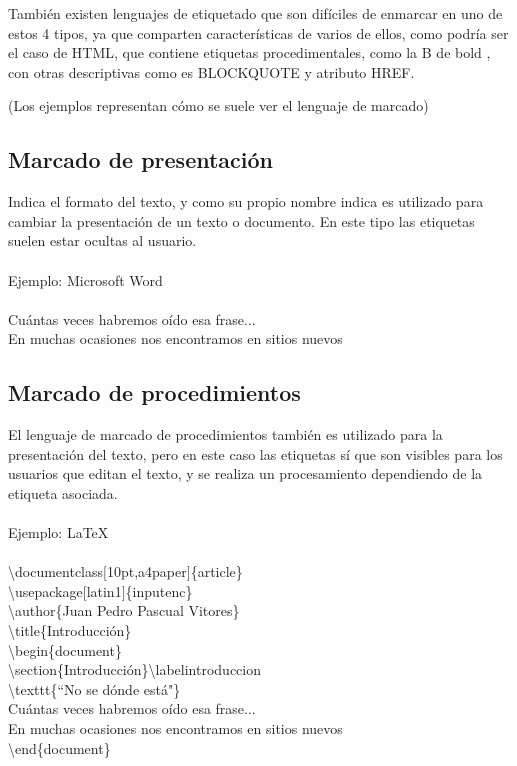 También existen lenguajes de etiquetado que son difíciles de enmarcar en uno de estos 4 tipos, ya que comparten características de varios de ellos, como podría ser el caso de HTML, que contiene etiquetas procedimentales, como la B de bold , con otras descriptivas como es BLOCKQUOTE y atributo HREF.


(Los ejemplos representan cómo se suele ver el lenguaje de marcado)

\subsection{Marcado de presentación}\label{marcado-presentacion}

Indica el formato del texto, y como su propio nombre indica es utilizado para cambiar la presentación de un texto o documento. En este tipo las etiquetas suelen estar ocultas al usuario.
\\
\\
Ejemplo: Microsoft Word
\\
\\
Cuántas veces habremos oído esa frase...
\\
En muchas ocasiones nos encontramos en sitios nuevos

\subsection{Marcado de procedimientos}\label{marcado-procedimientos}

El lenguaje de marcado de procedimientos también es utilizado para la presentación del texto, pero en este caso las etiquetas sí que son visibles para los usuarios que editan el texto, y se realiza un procesamiento dependiendo de la etiqueta asociada.
\\
\\
Ejemplo: LaTeX
\\
\\
\textbackslash documentclass$[$10pt,a4paper$]$\{article\}
\\
\textbackslash usepackage$[$latin1$]$\{inputenc\}
\\
\textbackslash author\{Juan Pedro Pascual Vitores\}
\\
\textbackslash title\{Introducción\}
\\
\textbackslash begin\{document\}
\\
\textbackslash section\{Introducción\}\textbackslash label{introduccion}
\\
\textbackslash texttt\{``No se dónde está"\}
\\
Cuántas veces habremos oído esa frase...
\\
En muchas ocasiones nos encontramos en sitios nuevos
\\
\textbackslash end\{document\}
\\
\\

